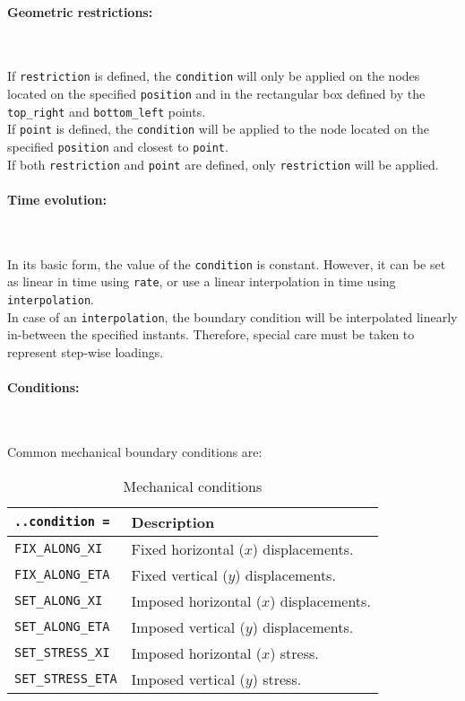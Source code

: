 \documentclass[10pt]{article}
\newcommand{\whiteline}{\textcolor{white}{.\\}}
\begin{document}
\paragraph{Geometric restrictions:} \whiteline

If \verb+restriction+ is defined, the \verb+condition+ will only be applied on the nodes located on the specified \verb+position+ and in the rectangular box defined by the \verb+top_right+ and \verb+bottom_left+ points.\\

If \verb+point+ is defined, the \verb+condition+ will be applied to the node located on the specified \verb+position+ and closest to \verb+point+.\\

If both \verb+restriction+ and \verb+point+ are defined, only \verb+restriction+ will be applied.

\paragraph{Time evolution:} \whiteline

In its basic form, the value of the \verb+condition+ is constant. However, it can be set as linear in time using \verb+rate+, or use a linear interpolation in time using \verb+interpolation+.\\

In case of an \verb+interpolation+, the boundary condition will be interpolated linearly in-between the specified instants. Therefore, special care must be taken to represent step-wise loadings.

\paragraph{Conditions:} \whiteline

Common mechanical boundary conditions are:

\begin{table}[h!]
\begin{tabularx}{\textwidth}{lX}
\verb+..condition =+ & Description\\
\hline
\verb+FIX_ALONG_XI+ & Fixed horizontal ($x$) displacements.\\
\verb+FIX_ALONG_ETA+ & Fixed vertical ($y$) displacements.\\
\verb+SET_ALONG_XI+ & Imposed horizontal ($x$) displacements.\\
\verb+SET_ALONG_ETA+ & Imposed vertical ($y$) displacements.\\
\verb+SET_STRESS_XI+ & Imposed horizontal ($x$) stress.\\
\verb+SET_STRESS_ETA+ & Imposed vertical ($y$) stress.\\
\hline
\end{tabularx}
\caption{Mechanical conditions}
\end{table}
\end{document}
